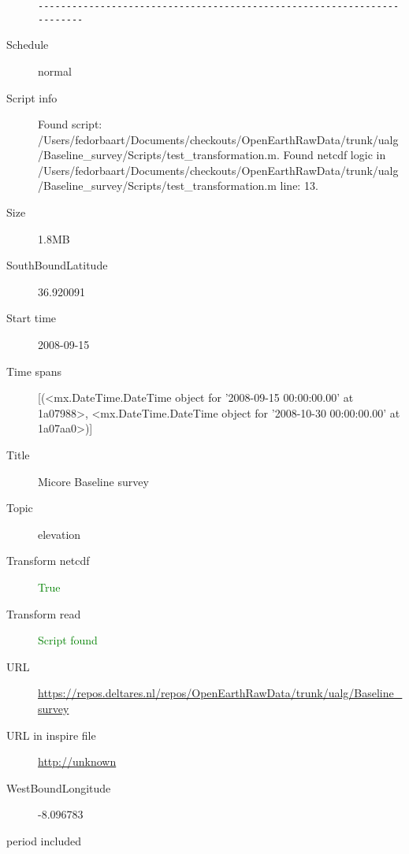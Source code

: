 \documentclass[9]{report}
\begin{document}
\begin{description}
\begin{verbatim}
------------------------------------------------------------------------

\end{verbatim}
  \item[Schedule] normal
  \item[Script info] Found script: /Users/fedorbaart/Documents/checkouts/OpenEarthRawData/trunk/ualg/Baseline\_survey/Scripts/test\_transformation.m.
Found netcdf logic in /Users/fedorbaart/Documents/checkouts/OpenEarthRawData/trunk/ualg/Baseline\_survey/Scripts/test\_transformation.m line: 13.
  \item[Size] 1.8MB
  \item[SouthBoundLatitude] 36.920091
  \item[Start time] 2008-09-15
  \item[Time spans] [(<mx.DateTime.DateTime object for '2008-09-15 00:00:00.00' at 1a07988>, <mx.DateTime.DateTime object for '2008-10-30 00:00:00.00' at 1a07aa0>)]
  \item[Title]  Micore Baseline survey 
  \item[Topic] elevation
  \item[Transform netcdf] \textcolor{green}{True}
  \item[Transform read] \textcolor{green}{Script found}
  \item[URL] \href{https://repos.deltares.nl/repos/OpenEarthRawData/trunk/ualg/Baseline\_survey}{https://repos.deltares.nl/repos/OpenEarthRawData/trunk/ualg/Baseline\_survey}
  \item[URL in inspire file] \href{http://unknown}{http://unknown}
  \item[WestBoundLongitude] -8.096783
  \item[period included] 
\end{description}
\end{document}
